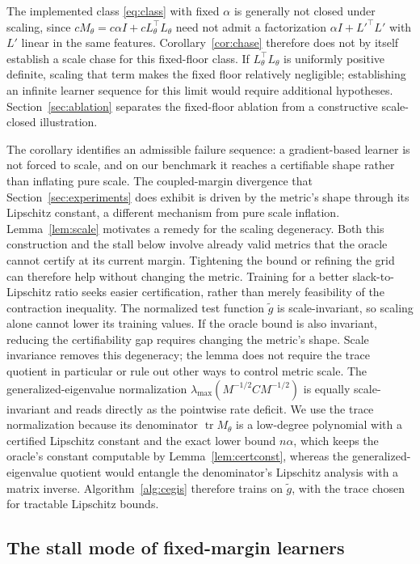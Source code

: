 \documentclass[12pt,onecolumn,journal]{IEEEtran}
\newcommand{\lmax}{\lambda_{\max}}
\providecommand{\tr}{}
\renewcommand{\tr}{\operatorname{tr}}
\begin{document}
The implemented class \eqref{eq:class} with fixed $\alpha$ is generally not closed under scaling, since $cM_\theta=c\alpha I+cL_\theta^\top L_\theta$ need not admit a factorization $\alpha I+L'^\top L'$ with $L'$ linear in the same features. Corollary~\ref{cor:chase} therefore does not by itself establish a scale chase for this fixed-floor class. If $L_\theta^\top L_\theta$ is uniformly positive definite, scaling that term makes the fixed floor relatively negligible; establishing an infinite learner sequence for this limit would require additional hypotheses. Section~\ref{sec:ablation} separates the fixed-floor ablation from a constructive scale-closed illustration.

The corollary identifies an admissible failure sequence: a gradient-based learner is not forced to scale, and on our benchmark it reaches a certifiable shape rather than inflating pure scale. The coupled-margin divergence that Section~\ref{sec:experiments} does exhibit is driven by the metric's shape through its Lipschitz constant, a different mechanism from pure scale inflation. Lemma~\ref{lem:scale} motivates a remedy for the scaling degeneracy. Both this construction and the stall below involve already valid metrics that the oracle cannot certify at its current margin. Tightening the bound or refining the grid can therefore help without changing the metric. Training for a better slack-to-Lipschitz ratio seeks easier certification, rather than merely feasibility of the contraction inequality. The normalized test function $\tilde g$ is scale-invariant, so scaling alone cannot lower its training values. If the oracle bound is also invariant, reducing the certifiability gap requires changing the metric's shape. Scale invariance removes this degeneracy; the lemma does not require the trace quotient in particular or rule out other ways to control metric scale. The generalized-eigenvalue normalization $\lmax(M^{-1/2} C M^{-1/2})$ is equally scale-invariant and reads directly as the pointwise rate deficit. We use the trace normalization because its denominator $\tr M_\theta$ is a low-degree polynomial with a certified Lipschitz constant and the exact lower bound $n\alpha$, which keeps the oracle's constant computable by Lemma~\ref{lem:certconst}, whereas the generalized-eigenvalue quotient would entangle the denominator's Lipschitz analysis with a matrix inverse. Algorithm~\ref{alg:cegis} therefore trains on $\tilde g$, with the trace chosen for tractable Lipschitz bounds.

\subsection{The stall mode of fixed-margin learners}
\end{document}
